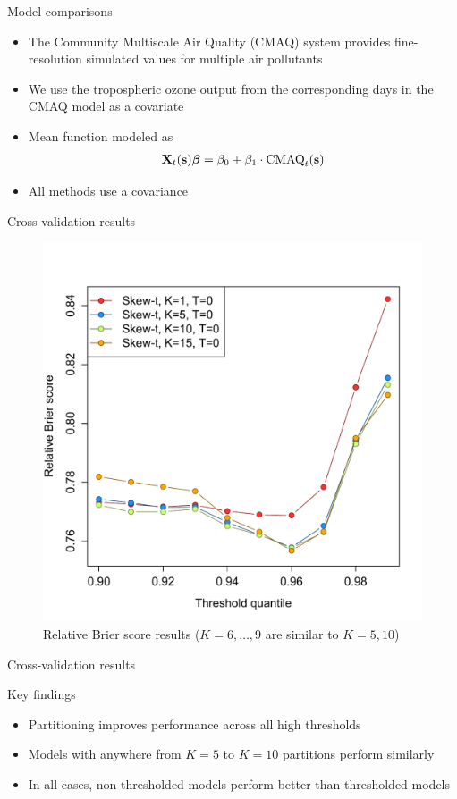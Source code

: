 \documentclass{beamer}
\begin{document}
\begin{frame}{Model comparisons}
  \begin{itemize} \setlength{\itemsep}{1em}
    \item The Community Multiscale Air Quality (CMAQ) system provides fine-resolution simulated values for multiple air pollutants
    \item We use the tropospheric ozone output from the corresponding days in the CMAQ model as a covariate
    \item Mean function modeled as
    \begin{align*}
    	\mbox{\bf X}_t(\mbox{\bf s}) \mbox{\boldmath $\beta$} = \beta_0 + \beta_1 \cdot \text{CMAQ}_t (\mbox{\bf s})
    \end{align*}
    \item All methods use a \Matern covariance
   \end{itemize}
\end{frame}

\begin{frame}{Cross-validation results}
  \centering
  \begin{figure}
    \includegraphics[width=0.6\linewidth, trim=0 0 0 1in]{./plots/pot/bs-ozone-1.pdf}
    \caption{Relative Brier score results ($K = 6, \ldots, 9$ are similar to $K = 5, 10$)}
  \end{figure}
\end{frame}

\begin{frame}{Cross-validation results}
\begin{adjustwidth}{1em}{0em}
  Key findings \vspace{1em}
  \begin{itemize} \setlength{\itemsep}{1em}
    \item Partitioning improves performance across all high thresholds
    \item Models with anywhere from $K = 5$ to $K = 10$ partitions perform similarly
    \item In all cases, non-thresholded models perform better than thresholded models
  \end{itemize}
\end{adjustwidth}
\end{frame}
\end{document}
